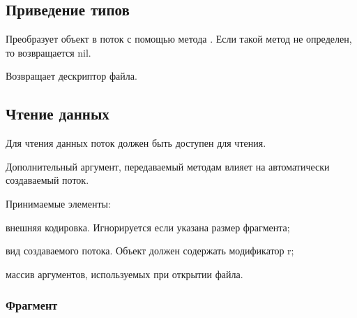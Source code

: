 \subsection{Приведение типов}

\begin{methodlist}
  Преобразует объект в поток с помощью метода . Если такой метод не определен, то возвращается nil. 

  Возвращает дескриптор файла.

\end{methodlist}
 

\subsection{Чтение данных}

Для чтения данных поток должен быть доступен для чтения.

Дополнительный аргумент, передаваемый методам влияет на автоматически создаваемый поток.
\begin{keylist}{Принимаемые элементы:}
  
   внешняя кодировка. Игнорируется если указана размер фрагмента;
  
   вид создаваемого потока. Объект должен содержать модификатор r;
  
   массив аргументов, используемых при открытии файла.
\end{keylist}

\subsubsection*{Фрагмент}

